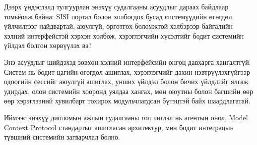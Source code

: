 Дээрх үндэслэлд тулгуурлан энэхүү судалгааны асуудлыг дараах байдлаар томьёолж байна: SISI портал болон холбогдох бусад системүүдийн өгөгдөл, үйлчилгээг найдвартай, аюулгүй, өргөтгөх боломжтой хэлбэрээр байгалийн хэлний интерфейстэй хэрхэн холбож, хэрэглэгчийн хүсэлтийг бодит системийн үйлдэл болгон хөрвүүлэх вэ?

Энэ асуудлыг шийдэхэд зөвхөн хэлний интерфейсийн өнгөц давхарга хангалтгүй. Систем нь бодит цагийн өгөгдөл ашиглах, хэрэглэгчийг дахин нэвтрүүлэхгүйгээр одоогийн сессийг аюулгүй ашиглах, унших үйлдэл болон бичих үйлдлийг ялгаж удирдах, олон системийн хооронд уялдаа хангах, мөн оюутны болон багшийн өөр өөр хэрэглээний хувилбарт тохирох модульчлагдсан бүтэцтэй байх шаардлагатай.

Иймээс энэхүү дипломын ажлын судалгааны гол чиглэл нь агентын онол, Model Context Protocol стандартыг ашигласан архитектур, мөн бодит интеграцын түвшний системийн загварчлал болно.
